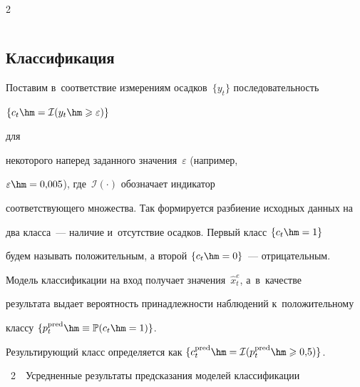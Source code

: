 \begin{multicols}{2}
\begin{table}[b]
\begin{center}
\begin{tabular}{|l|c|l|c|c|}
\end{tabular}

\end{center}

\end{table}



\subsection{Классификация}




Поставим в~соответствие измерениям осадков~$\{y_t\}$ последовательность 

$\{ c_t \hm=\mathcal {I} (y_t\hm\geqslant \varepsilon)\}$ 

для\linebreak

 некоторого наперед заданного значения~$\varepsilon$ (например,

 $\varepsilon \hm= 0{,}005$), где~$\mathcal {I}(\cdot)$ обозначает индикатор 

 соответствующего множества. Так формируется разби\-ение исходных данных на 

 два класса~--- наличие и~отсутствие осадков. Первый класс $\{ c_t \hm= 1\}$ 

 будем называть положительным, а второй $\{c_t \hm= 0\}$~--- отрицательным. 

 Модель классификации на вход получает значения~$\hat{x}^e_t$, а~в~качестве 

 результата выдает вероятность принадлежности наблюдений к~положительному 

 классу $\{p^{\mathrm{pred}}_t \hm\equiv \mathbb P(c_t \hm= 1)\}$. 

 Результирующий класс определяется как $\{ c^{\mathrm{pred}}_t \hm=\mathcal {I}

  (p^{\mathrm{pred}}_t

 \hm\geqslant 0{,}5)\}$.

 

 



\noindent

{{\tablename~2}\ \ \small{Усредненные результаты предсказания моделей классификации}}



\end{multicols}

